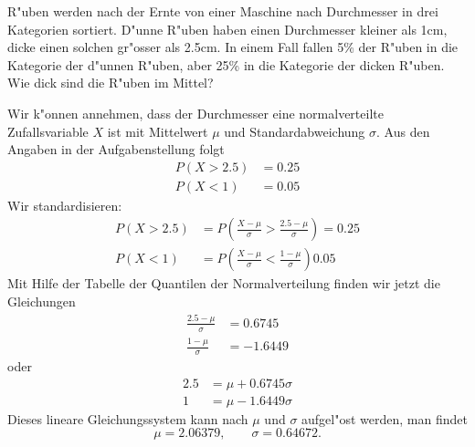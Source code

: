 R"uben werden nach der Ernte von einer Maschine nach Durchmesser
in drei Kategorien sortiert. D"unne R"uben haben einen Durchmesser
kleiner als 1cm, dicke einen solchen gr"osser als 2.5cm. In einem
Fall fallen 5\% der R"uben in die Kategorie der d"unnen R"uben,
aber 25\% in die Kategorie der dicken R"uben. Wie dick sind
die R"uben im Mittel?

\begin{loesung}
Wir k"onnen annehmen, dass der Durchmesser eine normalverteilte
Zufallsvariable $X$ ist
mit Mittelwert $\mu$ und Standardabweichung $\sigma$. Aus den
Angaben in der Aufgabenstellung folgt
\begin{align*}
P(X>2.5)&= 0.25\\
P(X<1)&= 0.05
\end{align*}
Wir standardisieren:
\begin{align*}
P(X>2.5)&=P\left(
\frac{X-\mu}{\sigma}>\frac{2.5-\mu}{\sigma}
\right)=0.25
\\
P(X<1)&=P\left(
\frac{X-\mu}{\sigma}<\frac{1-\mu}{\sigma}
\right)0.05
\end{align*}
Mit Hilfe der Tabelle der Quantilen der Normalverteilung finden
wir jetzt die Gleichungen
\begin{align*}
\frac{2.5-\mu}{\sigma}&=0.6745
\\
\frac{1-\mu}{\sigma}&=-1.6449
\end{align*}
oder
\begin{align*}
2.5&=\mu+0.6745\sigma\\
1&=\mu-1.6449\sigma
\end{align*}
Dieses lineare Gleichungssystem kann nach $\mu$ und $\sigma$ aufgel"ost
werden, man findet
\[
\mu=2.06379,\qquad
\sigma=0.64672.
\]
\end{loesung}

